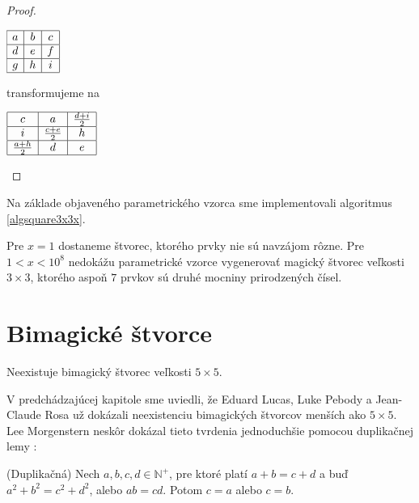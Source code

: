 \begin{proof}
\begin{center}
$\begin{array}{ |c|c|c| } 
\hline
a & b & c \\ 
\hline
d & e & f \\ 
\hline
g & h & i \\
\hline
\end{array}$
\end{center}

transformujeme na

\begin{center}
$\begin{array}{ |c|c|c| } 
\hline
c & a & \frac{d+i}{2} \\ 
\hline
i & \frac{c+e}{2} & h \\ 
\hline
\frac{a+h}{2} & d & e \\
\hline
\end{array}$
\end{center}
\end{proof}

Na základe objaveného parametrického vzorca sme implementovali algoritmus \ref{algsquare3x3x}.

\begin{result} Pre $x = 1$ dostaneme štvorec, ktorého prvky nie sú navzájom rôzne. Pre $1 < x < 10^8$ nedokážu parametrické vzorce vygenerovať magický štvorec veľkosti $3 \times 3$, ktorého aspoň $7$ prvkov sú druhé mocniny prirodzených čísel.
\end{result}

\section{Bimagické štvorce}

\begin{hypothesis} Neexistuje bimagický štvorec veľkosti $5 \times 5$.
\end{hypothesis}

V predchádzajúcej kapitole sme uviedli, že Eduard Lucas, Luke Pebody a Jean-Claude Rosa už dokázali neexistenciu bimagických štvorcov menších ako $5 \times 5$. Lee Morgenstern neskôr dokázal tieto tvrdenia jednoduchšie pomocou duplikačnej lemy \cite{multimagie}:

\begin{lemma}
\label{dupl}
(Duplikačná) Nech $a,b,c,d \in \mathbb{N^+}$, pre ktoré platí $a + b = c + d$ a buď $a^2 + b^2 = c^2 + d^2$, alebo $ab = cd$. Potom $c = a$ alebo $c = b$.
\end{lemma}
 
